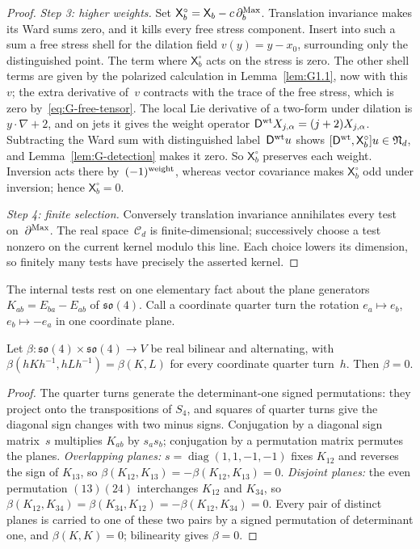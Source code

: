 \begin{proof}
\emph{Step 3: higher weights.} Set $\mathsf X^\circ_b=\mathsf X_b-c\,\partial^{\rm Max}_b$. Translation invariance makes its Ward sums zero, and it kills every free stress component. Insert into such a sum a free stress shell for the dilation field $v(y)=y-x_0$, surrounding only the distinguished point. The term where $\mathsf X^\circ_b$ acts on the stress is zero. The other shell terms are given by the polarized calculation in Lemma~\ref{lem:G1.1}, now with this~$v$; the extra derivative of~$v$ contracts with the trace of the free stress, which is zero by~\eqref{eq:G-free-tensor}. The local Lie derivative of a two-form under dilation is $y\cdot\nabla+2$, and on jets it gives the weight operator $\mathsf D^{\rm wt}X_{j,\alpha}=(j+2)X_{j,\alpha}$. Subtracting the Ward sum with distinguished label~$\mathsf D^{\rm wt}u$ shows $[\mathsf D^{\rm wt},\mathsf X^\circ_b]u\in\mathfrak N_d$, and Lemma~\ref{lem:G-detection} makes it zero. So $\mathsf X^\circ_b$ preserves each weight. Inversion acts there by~$(-1)^{\rm weight}$, whereas vector covariance makes $\mathsf X^\circ_b$ odd under inversion; hence $\mathsf X^\circ_b=0$.

\emph{Step 4: finite selection.} Conversely translation invariance annihilates every test on~$\partial^{\rm Max}$. The real space~$\mathcal C_d$ is finite-dimensional; successively choose a test nonzero on the current kernel modulo this line. Each choice lowers its dimension, so finitely many tests have precisely the asserted kernel.
\end{proof}

The internal tests rest on one elementary fact about the plane generators $K_{ab}=E_{ba}-E_{ab}$ of $\mathfrak{so}(4)$. Call a coordinate quarter turn the rotation $e_a\mapsto e_b$, $e_b\mapsto-e_a$ in one coordinate plane.
\begin{lemma}\label{lem:G-planes}
Let $\beta:\mathfrak{so}(4)\times\mathfrak{so}(4)\to V$ be real bilinear and alternating, with $\beta(hKh^{-1},hLh^{-1})=\beta(K,L)$ for every coordinate quarter turn~$h$. Then $\beta=0$.
\end{lemma}
\begin{proof}
The quarter turns generate the determinant-one signed permutations: they project onto the transpositions of $S_4$, and squares of quarter turns give the diagonal sign changes with two minus signs. Conjugation by a diagonal sign matrix~$s$ multiplies $K_{ab}$ by $s_as_b$; conjugation by a permutation matrix permutes the planes. \emph{Overlapping planes:} $s=\operatorname{diag}(1,1,-1,-1)$ fixes $K_{12}$ and reverses the sign of $K_{13}$, so $\beta(K_{12},K_{13})=-\beta(K_{12},K_{13})=0$. \emph{Disjoint planes:} the even permutation $(13)(24)$ interchanges $K_{12}$ and $K_{34}$, so $\beta(K_{12},K_{34})=\beta(K_{34},K_{12})=-\beta(K_{12},K_{34})=0$. Every pair of distinct planes is carried to one of these two pairs by a signed permutation of determinant one, and $\beta(K,K)=0$; bilinearity gives $\beta=0$.
\end{proof}

